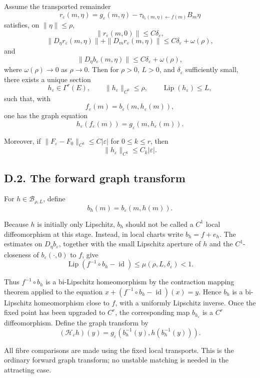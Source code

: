 \documentclass[12pt,a4paper]{article}
\theoremstyle{plain}
\numberwithin{equation}{section}
\numberwithin{theorem}{section}
\begin{document}
Assume the transported remainder
\[
r_\varepsilon(m,\eta)
=
g_\varepsilon(m,\eta)-\tau_{b_\varepsilon(m,\eta)\leftarrow f(m)}B_m\eta
\]
satisfies, on $\|\eta\|\le\rho$,
\[
\|r_\varepsilon(m,0)\|\le C\delta_\varepsilon,
\]
\[
\|D_\eta r_\varepsilon(m,\eta)\|+
\|D_m r_\varepsilon(m,\eta)\|
\le C\delta_\varepsilon+
\omega(\rho),
\]
and
\[
\|D_\eta b_\varepsilon(m,\eta)\|
\le C\delta_\varepsilon+
\omega(\rho),
\]
where $\omega(\rho)\to0$ as $\rho\to0$. Then for $\rho>0$, $L>0$, and $\delta_\varepsilon$ sufficiently small, there exists a unique section
\[
h_\varepsilon\in\Gamma^r(E),
\qquad
\|h_\varepsilon\|_{C^0}\le\rho,
\qquad
\operatorname{Lip}(h_\varepsilon)\le L,
\]
such that, with
\[
f_\varepsilon(m)=b_\varepsilon(m,h_\varepsilon(m)),
\]
one has the graph equation
\[
h_\varepsilon(f_\varepsilon(m))
=
g_\varepsilon(m,h_\varepsilon(m)).
\]

Moreover, if $\|F_\varepsilon-F_0\|_{C^k}\le C|\varepsilon|$ for $0\le k\le r$, then
\[
\|h_\varepsilon\|_{C^k}
\le C_k|\varepsilon|.
\]

\subsection{D.2. The forward graph transform}

For $h\in\mathcal B_{\rho,L}$, define
\[
b_h(m)=b_\varepsilon(m,h(m)).
\]

Because $h$ is initially only Lipschitz, $b_h$ should not be called a $C^1$ local diffeomorphism at this stage. Instead, in local charts write $b_h=f+e_h$. The estimates on $D_\eta b_\varepsilon$, together with the small Lipschitz aperture of $h$ and the $C^1$-closeness of $b_\varepsilon(\cdot,0)$ to $f$, give
\[
\operatorname{Lip}(f^{-1}\circ b_h-\operatorname{id})
\le \mu(\rho,L,\delta_\varepsilon)<1.
\]

Thus $f^{-1}\circ b_h$ is a bi-Lipschitz homeomorphism by the contraction mapping theorem applied to the equation $x+(f^{-1}\circ b_h-\operatorname{id})(x)=y$. Hence $b_h$ is a bi-Lipschitz homeomorphism close to $f$, with a uniformly Lipschitz inverse. Once the fixed point has been upgraded to $C^r$, the corresponding map $b_{h_\varepsilon}$ is a $C^r$ diffeomorphism. Define the graph transform by
\[
(\mathcal H_\varepsilon h)(y)
=
g_\varepsilon(b_h^{-1}(y),h(b_h^{-1}(y))).
\]

All fibre comparisons are made using the fixed local transports. This is the ordinary forward graph transform; no unstable matching is needed in the attracting case.
\end{document}

